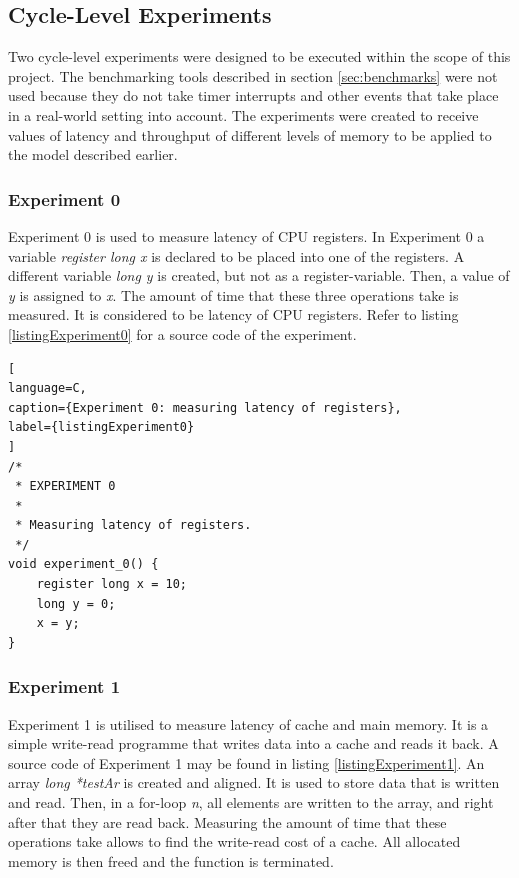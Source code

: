 \subsection{Cycle-Level Experiments}
\label{design_cycle_level}

Two cycle-level experiments were designed to be executed within the scope of this project. The benchmarking tools described in section \ref{sec:benchmarks} were not used because they do not take timer interrupts and other events that take place in a real-world setting into account. The experiments were created to receive values of latency and throughput of different levels of memory to be applied to the model described earlier.

\subsubsection{Experiment 0}

Experiment 0 is used to measure latency of CPU registers. In Experiment 0 a variable \textit{register long x} is declared to be placed into one of the registers. A different variable \textit{long y} is created, but not as a register-variable. Then, a value of \textit{y} is assigned to \textit{x}. The amount of time that these three operations take is measured. It is considered to be latency of CPU registers. Refer to listing \ref{listingExperiment0} for a source code of the experiment.

\begin{lstlisting}[
language=C,
caption={Experiment 0: measuring latency of registers},
label={listingExperiment0}
]
/*
 * EXPERIMENT 0
 *
 * Measuring latency of registers.
 */
void experiment_0() {
	register long x = 10;
	long y = 0;
	x = y;
}
\end{lstlisting}

\subsubsection{Experiment 1}

Experiment 1 is utilised to measure latency of cache and main memory. It is a simple write-read programme that writes data into a cache and reads it back. A source code of Experiment 1 may be found in listing \ref{listingExperiment1}. An array \textit{long *testAr} is created and aligned. It is used to store data that is written and read. Then, in a for-loop  \textit{n}, all elements are written to the array, and right after that they are read back. Measuring the amount of time that these operations take allows to find the write-read cost of a cache. All allocated memory is then freed and the function is terminated.

